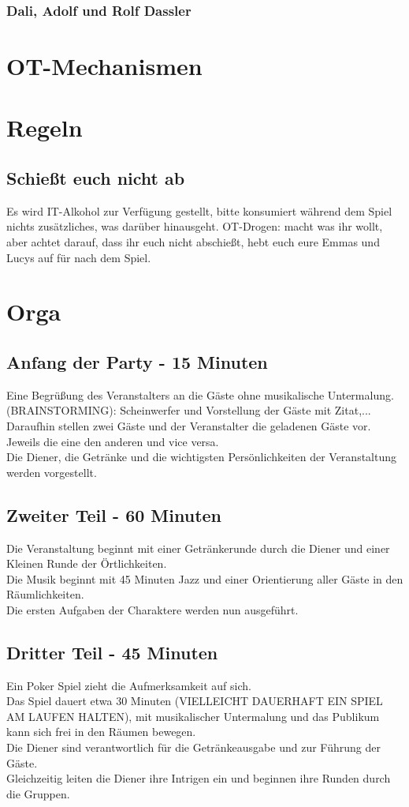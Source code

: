 \documentclass[12pt, a4paper, openany]{report}
\begin{document}
\subsection{Dali, Adolf und Rolf Dassler}

\chapter{OT-Mechanismen}

\chapter{Regeln}
\section{Schießt euch nicht ab}
Es wird IT-Alkohol zur Verfügung gestellt, bitte konsumiert während dem Spiel nichts zusätzliches, was darüber hinausgeht.
OT-Drogen: macht was ihr wollt, aber achtet darauf, dass ihr euch nicht abschießt, hebt euch eure Emmas und Lucys auf für nach dem Spiel.

\chapter{Orga}
\section{Anfang der Party - 15 Minuten}
Eine Begrüßung des Veranstalters an die Gäste ohne musikalische Untermalung.\\
(BRAINSTORMING): Scheinwerfer und Vorstellung der Gäste mit Zitat,... \\
Daraufhin stellen zwei Gäste und der Veranstalter die geladenen Gäste vor. Jeweils die eine den anderen und vice versa.\\
Die Diener, die Getränke und die wichtigsten Persönlichkeiten der Veranstaltung werden vorgestellt.
\section{Zweiter Teil - 60 Minuten}
Die Veranstaltung beginnt mit einer Getränkerunde durch die Diener und einer Kleinen Runde der Örtlichkeiten.\\
Die Musik beginnt mit 45 Minuten Jazz und einer Orientierung aller Gäste in den Räumlichkeiten.\\
Die ersten Aufgaben der Charaktere werden nun ausgeführt.
\section{Dritter Teil - 45 Minuten}
Ein Poker Spiel zieht die Aufmerksamkeit auf sich. \\
Das Spiel dauert etwa 30 Minuten (VIELLEICHT DAUERHAFT EIN SPIEL AM LAUFEN HALTEN), mit musikalischer Untermalung und das Publikum kann sich frei in den Räumen bewegen.\\
Die Diener sind verantwortlich für die Getränkeausgabe und zur Führung der Gäste.\\
Gleichzeitig leiten die Diener ihre Intrigen ein und beginnen ihre Runden durch die Gruppen.
\end{document}
